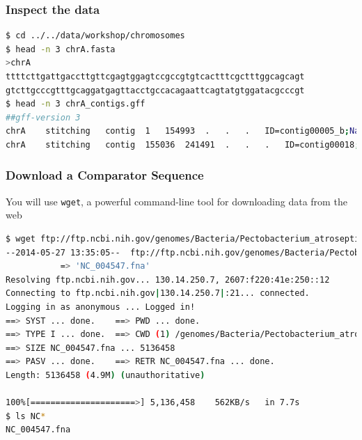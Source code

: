 \documentclass[table]{beamer}
\begin{document}
  \begin{frame}[fragile]
    \frametitle{Inspect the data}
    \begin{lstlisting}[language=bash]
$ cd ../../data/workshop/chromosomes
$ head -n 3 chrA.fasta 
>chrA
ttttcttgattgaccttgttcgagtggagtccgccgtgtcactttcgctttggcagcagt
gtcttgcccgtttgcaggatgagttacctgccacagaattcagtatgtggatacgcccgt
$ head -n 3 chrA_contigs.gff 
##gff-version 3
chrA	stitching	contig	1	154993	.	.	.	ID=contig00005_b;Name=contig00005_b
chrA	stitching	contig	155036	241491	.	.	.	ID=contig00018;Name=contig00018
    \end{lstlisting}
\end{frame}  

  \begin{frame}[fragile]
    \frametitle{Download a Comparator Sequence}
    You will use \texttt{wget}, a powerful command-line tool for downloading data from the web
    \begin{lstlisting}[language=bash]
$ wget ftp://ftp.ncbi.nih.gov/genomes/Bacteria/Pectobacterium_atrosepticum_SCRI1043_uid57957/NC_004547.fna
--2014-05-27 13:35:05--  ftp://ftp.ncbi.nih.gov/genomes/Bacteria/Pectobacterium_atrosepticum_SCRI1043_uid57957/NC_004547.fna
           => 'NC_004547.fna'
Resolving ftp.ncbi.nih.gov... 130.14.250.7, 2607:f220:41e:250::12
Connecting to ftp.ncbi.nih.gov|130.14.250.7|:21... connected.
Logging in as anonymous ... Logged in!
==> SYST ... done.    ==> PWD ... done.
==> TYPE I ... done.  ==> CWD (1) /genomes/Bacteria/Pectobacterium_atrosepticum_SCRI1043_uid57957 ... done.
==> SIZE NC_004547.fna ... 5136458
==> PASV ... done.    ==> RETR NC_004547.fna ... done.
Length: 5136458 (4.9M) (unauthoritative)

100%[=====================>] 5,136,458    562KB/s   in 7.7s 
$ ls NC*
NC_004547.fna
    \end{lstlisting}
\end{frame}  


\end{document}
